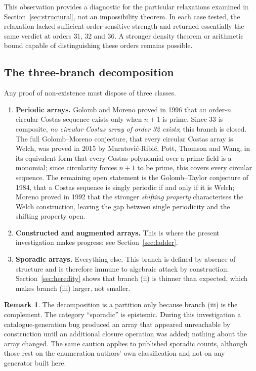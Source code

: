 \documentclass[11pt,a4paper]{article}
\theoremstyle{definition}
\newtheorem{remark}[theorem]{Remark}
\begin{document}
This observation provides a diagnostic for the particular relaxations examined
in Section~\ref{sec:structural}, not an impossibility theorem. In each case
tested, the relaxation lacked sufficient order-sensitive strength and returned
essentially the same verdict at orders 31, 32 and 36. A stronger density theorem
or arithmetic bound capable of distinguishing these orders remains possible.

\subsection{The three-branch decomposition}

Any proof of non-existence must dispose of three classes.

\begin{enumerate}[label=(\roman*)]
\item \textbf{Periodic arrays.} Golomb and Moreno proved in 1996 that an order-$n$ circular Costas sequence exists only when $n+1$ is prime. Since 33 is composite,
\emph{no circular Costas array of order 32 exists}; this branch is closed. The full Golomb--Moreno conjecture, that every circular Costas array is Welch, was proved in 2015 by
Muratovi\'c-Ribi\'c, Pott, Thomson and Wang, in its equivalent form that every Costas polynomial over a
prime field is a monomial; since circularity forces $n+1$ to be prime, this covers every circular
sequence. The remaining open statement is the Golomb--Taylor conjecture of
1984, that a Costas sequence is singly periodic if and only if it is Welch;
Moreno proved in 1992 that the stronger \emph{shifting property} characterises
the Welch construction, leaving the gap between single periodicity and the
shifting property open.

\item \textbf{Constructed and augmented arrays.} This is where the present
investigation makes progress; see Section~\ref{sec:ladder}.

\item \textbf{Sporadic arrays.} Everything else. This branch is defined by
absence of structure and is therefore immune to algebraic attack by
construction. Section~\ref{sec:heredity} shows that branch (ii) is thinner than
expected, which makes branch (iii) larger, not smaller.
\end{enumerate}

\begin{remark}
The decomposition is a partition only because branch (iii) is the complement.
The category ``sporadic'' is epistemic. During this investigation a
catalogue-generation bug produced an array that appeared unreachable by
construction until an additional closure operation was added; nothing about the
array changed. The same caution applies to published sporadic counts, although
those rest on the enumeration authors' own classification and not on any
generator built here.
\end{remark}
\end{document}
